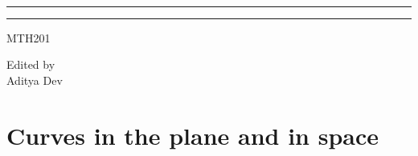 \documentclass{notes}
\begin{document}
\begin{titlepage}
		{\huge {}\\} %
		
		\vspace{0.75\baselineskip} %
		
		\rule{\textwidth}{0.4pt}\vspace*{-\baselineskip}\vspace{3.2pt} %
		\rule{\textwidth}{1.6pt} %
		
		\vspace{2\baselineskip} %
		
		
		\LARGE{MTH201} 
		
		\vspace*{3\baselineskip} %
		
		
		
		\vspace{0.5\baselineskip} %
		
		
		\vspace{0.5\baselineskip} %
		
		
		\vfill %
		
		
		
		\vspace{0.3\baselineskip} %
		
		
		{\large Edited by\\  Aditya Dev} 
		
	\end{titlepage}
	\tableofcontents
\chapter{Curves in the plane and in space}
\end{document}
